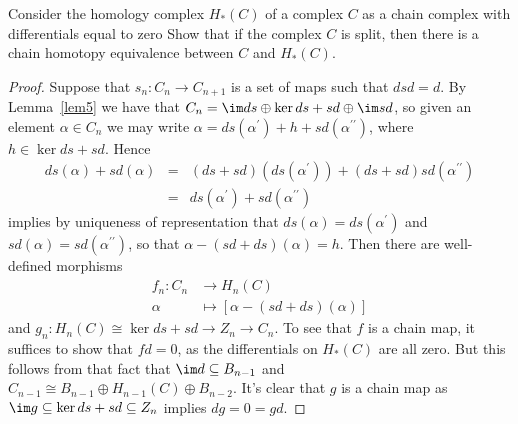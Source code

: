 \documentclass[10pt]{amsart}
\begin{document}
\begin{ex}\label{Ex2}
  Consider the homology complex $H_*(C)$ of a complex $C$ as a chain complex with differentials equal to zero
  Show that if the complex $C$ is split, then there is a chain homotopy equivalence between $C$ and $H_*(C)$.

  \begin{proof}
    Suppose that $s_n : C_n \rightarrow C_{n+1}$ is a set of maps such that $dsd = d$.
    By Lemma~\ref{lem5} we have that $C_n = \im ds \oplus \ker ds + sd \oplus \im sd$, so given an element $\alpha \in C_n$ we may write $\alpha = ds(\alpha^\prime) + h + sd(\alpha^{\prime\prime})$, where $h \in \ker ds + sd$.
    Hence
    \begin{eqnarray*}
      ds(\alpha) + sd(\alpha) &=& (ds + sd)(ds(\alpha^\prime)) + (ds + sd) sd(\alpha^{\prime\prime})\\
      &=& ds(\alpha^\prime) + sd(\alpha^{\prime\prime})
    \end{eqnarray*}
    implies by uniqueness of representation that $ds(\alpha) = ds(\alpha^\prime)$ and $sd(\alpha) = sd(\alpha^{\prime\prime})$, so that $\alpha - (sd + ds)(\alpha) = h$.
    Then there are well-defined morphisms
    \begin{align*}
      f_n \colon C_n &\rightarrow H_n(C)\\
      \alpha &\mapsto [\alpha - (sd + ds)(\alpha)]
    \end{align*}
    and
    $g_n : H_n(C) \cong \ker ds + sd \rightarrow Z_n \rightarrow C_n$.
    To see that $f$ is a chain map, it suffices to show that $fd = 0$, as the differentials on $H_*(C)$ are all zero.
    But this follows from that fact that $\im d \subseteq B_{n-1}$ and $C_{n-1} \cong B_{n-1} \oplus H_{n-1}(C) \oplus B_{n-2}$.
    It's clear that $g$ is a chain map as $\im g \subseteq \ker ds + sd \subseteq Z_n$ implies $dg = 0 = gd$.


\end{proof}
\end{ex}
\end{document}
